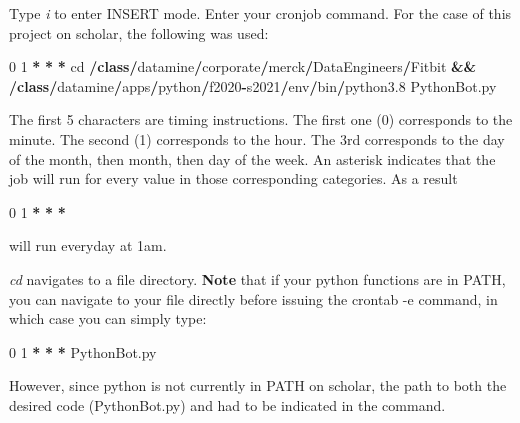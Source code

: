 \documentclass[]{book}
\newenvironment{Shaded}{\begin{snugshade}}{\end{snugshade}}
\newcommand{\KeywordTok}[1]{\textcolor[rgb]{0.13,0.29,0.53}{\textbf{#1}}}
\newcommand{\DecValTok}[1]{\textcolor[rgb]{0.00,0.00,0.81}{#1}}
\newcommand{\FloatTok}[1]{\textcolor[rgb]{0.00,0.00,0.81}{#1}}
\newcommand{\OperatorTok}[1]{\textcolor[rgb]{0.81,0.36,0.00}{\textbf{#1}}}
\newcommand{\BuiltInTok}[1]{#1}
\newcommand{\NormalTok}[1]{#1}
\begin{document}
Type \emph{i} to enter INSERT mode. Enter your cronjob command. For the
case of this project on scholar, the following was used:

\begin{Shaded}
\begin{Highlighting}[]
\DecValTok{0} \DecValTok{1} \OperatorTok{*} \OperatorTok{*} \OperatorTok{*}\NormalTok{ cd }\OperatorTok{/}\KeywordTok{class}\OperatorTok{/}\NormalTok{datamine}\OperatorTok{/}\NormalTok{corporate}\OperatorTok{/}\NormalTok{merck}\OperatorTok{/}\NormalTok{DataEngineers}\OperatorTok{/}\NormalTok{Fitbit }\OperatorTok{&&} \OperatorTok{/}\KeywordTok{class}\OperatorTok{/}\NormalTok{datamine}\OperatorTok{/}\NormalTok{apps}\OperatorTok{/}\NormalTok{python}\OperatorTok{/}\NormalTok{f2020}\OperatorTok{-}\NormalTok{s2021}\OperatorTok{/}\NormalTok{env}\OperatorTok{/}\BuiltInTok{bin}\OperatorTok{/}\NormalTok{python3}\FloatTok{.8}\NormalTok{ PythonBot.py}
\end{Highlighting}
\end{Shaded}

The first 5 characters are timing instructions. The first one (0)
corresponds to the minute. The second (1) corresponds to the hour. The
3rd corresponds to the day of the month, then month, then day of the
week. An asterisk indicates that the job will run for every value in
those corresponding categories. As a result

\begin{Shaded}
\begin{Highlighting}[]
\DecValTok{0} \DecValTok{1} \OperatorTok{*} \OperatorTok{*} \OperatorTok{*} 
\end{Highlighting}
\end{Shaded}

will run everyday at 1am.

\emph{cd} navigates to a file directory. \textbf{Note} that if your
python functions are in PATH, you can navigate to your file directly
before issuing the crontab -e command, in which case you can simply
type:

\begin{Shaded}
\begin{Highlighting}[]
\DecValTok{0} \DecValTok{1} \OperatorTok{*} \OperatorTok{*} \OperatorTok{*}\NormalTok{ PythonBot.py}
\end{Highlighting}
\end{Shaded}

However, since python is not currently in PATH on scholar, the path to
both the desired code (PythonBot.py) and had to be indicated in the
command.
\end{document}
